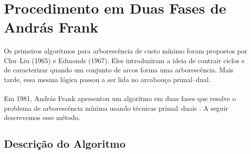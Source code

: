 \documentclass[12pt,a4paper]{article}
\def\emph#1{#1}%
\begin{document}
\section{Procedimento em Duas Fases de András Frank}

\paragraph{}
Os primeiros algoritmos para arborescência de custo mínimo foram propostos por Chu–Liu (1965) e Edmonds (1967). Eles introduziram a ideia de contrair ciclos e de caracterizar quando um conjunto de arcos forma uma arborescência. Mais tarde, essa mesma lógica passou a ser lida no arcabouço \emph{primal–dual}.

\paragraph{}
Em 1981, András Frank apresentou um algoritmo em duas fases que resolve o problema de arborescência mínima usando técnicas primal–duais \cite{frank1981}. A seguir descrevemos esse método.

\subsection{Descrição do Algoritmo}
\end{document}
